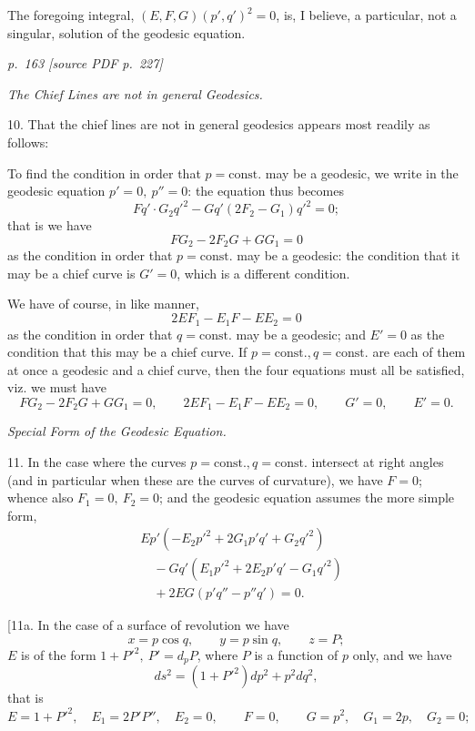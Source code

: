 \documentclass[11pt,a4paper]{article}
\newcommand{\sourcepage}[2]{%
  \bigskip
  \noindent\textit{p.~#1 [source PDF p.~#2]}%
  \par\smallskip
}
\newcommand{\qform}[2]{(#1)(#2)^2}
\begin{document}
The foregoing integral, \(\qform{E,F,G}{p',q'}=0\), is, I believe, a particular,
not a singular, solution of the geodesic equation.

\sourcepage{163}{227}

\begin{center}\itshape The Chief Lines are not in general Geodesics.\end{center}

10. That the chief lines are not in general geodesics appears most readily as follows:

To find the condition in order that \(p=\mathrm{const.}\) may be a geodesic, we write
in the geodesic equation \(p'=0,\ p''=0\): the equation thus becomes
\[
Fq'\cdot G_2q'^2-Gq'(2F_2-G_1)q'^2=0;
\]
that is we have
\[
FG_2-2F_2G+GG_1=0
\]
as the condition in order that \(p=\mathrm{const.}\) may be a geodesic: the condition
that it may be a chief curve is \(G'=0\), which is a different condition.

We have of course, in like manner,
\[
2EF_1-E_1F-EE_2=0
\]
as the condition in order that \(q=\mathrm{const.}\) may be a geodesic; and \(E'=0\)
as the condition that this may be a chief curve. If \(p=\mathrm{const.}, q=\mathrm{const.}\)
are each of them at once a geodesic and a chief curve, then the four equations must
all be satisfied, viz. we must have
\[
FG_2-2F_2G+GG_1=0,\qquad 2EF_1-E_1F-EE_2=0,\qquad
G'=0,\qquad E'=0.
\]

\begin{center}\itshape Special Form of the Geodesic Equation.\end{center}

11. In the case where the curves \(p=\mathrm{const.}, q=\mathrm{const.}\) intersect at
right angles (and in particular when these are the curves of curvature), we have
\(F=0\); whence also \(F_1=0,\ F_2=0\); and the geodesic equation assumes the more
simple form,
\[
\begin{aligned}
&Ep'(-E_2p'^2+2G_1p'q'+G_2q'^2)\\
&\quad -Gq'(E_1p'^2+2E_2p'q'-G_1q'^2)\\
&\quad +2EG(p'q''-p''q')=0.
\end{aligned}
\]

[11a. In the case of a surface of revolution we have
\[
x=p\cos q,\qquad y=p\sin q,\qquad z=P;
\]
\(E\) is of the form \(1+P'^2,\ P'=d_pP\), where \(P\) is a function of \(p\) only,
and we have
\[
ds^2=(1+P'^2)dp^2+p^2dq^2,
\]
that is
\[
E=1+P'^2,\quad E_1=2P'P'',\quad E_2=0,\qquad
F=0,\qquad
G=p^2,\quad G_1=2p,\quad G_2=0;
\]
\end{document}
